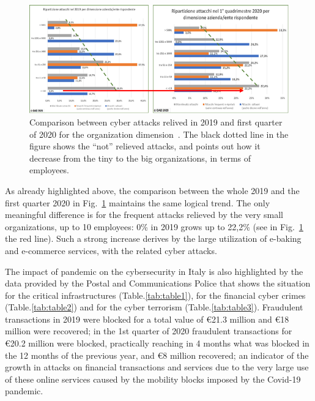 \documentclass{easychair}
\begin{document}
\begin{figure}
	\centering
		\includegraphics[width=1\textwidth]{pictures/fig3.png}
		\caption{Comparison between cyber attacks relived in 2019 and first quarter of 2020 for the organization dimension~\cite{oad20}. The black dotted line in the figure shows 
the “not” relieved attacks, and points out how it decrease from the tiny to the big organizations, in terms of employees. }
		\label{fig:3}
\end{figure}


As already highlighted above, the comparison between the whole 2019 and the first quarter 2020 in Fig.~\ref{fig:3} maintains the same logical trend. The only meaningful difference is for the frequent attacks relieved by the very
small organizations, up to 10 employees: 0\% in 2019 grows up to 22,2\% (see in Fig.~\ref{fig:3} the red line). Such a strong increase derives by the large utilization of e-baking and 
e-commerce services, with the related cyber attacks.

The impact of pandemic on the cybersecurity in Italy is also highlighted by the data provided by the Postal and Communications Police that shows the situation for the
critical infrastructures (Table.\ref{tab:table1}), for the financial cyber crimes (Table.\ref{tab:table2}) and for the cyber terrorism (Table.\ref{tab:table3}). 
Fraudulent transactions in 2019 were blocked for a total value of \euro 21.3 million and \euro 18 million were recovered; in the 1st quarter of 
2020 fraudulent transactions for \euro 20.2 million were blocked, practically reaching in 4 months what was blocked in the 12 months of the previous year, and \euro 8 million 
recovered; an indicator of the growth in attacks on financial transactions and services due to the very large use of these online services caused by the mobility blocks imposed 
by the Covid-19 pandemic.
\end{document}
